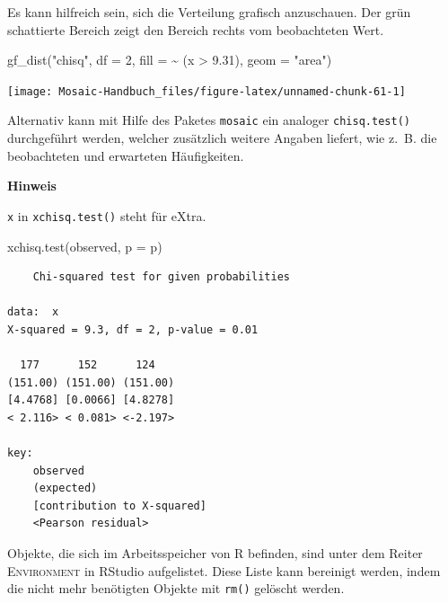 \documentclass[
  ngerman,
]{scrbook}
\newenvironment{Shaded}{\begin{snugshade}}{\end{snugshade}}
\newcommand{\AttributeTok}[1]{\textcolor[rgb]{0.77,0.63,0.00}{#1}}
\newcommand{\DecValTok}[1]{\textcolor[rgb]{0.00,0.00,0.81}{#1}}
\newcommand{\FloatTok}[1]{\textcolor[rgb]{0.00,0.00,0.81}{#1}}
\newcommand{\FunctionTok}[1]{\textcolor[rgb]{0.00,0.00,0.00}{#1}}
\newcommand{\NormalTok}[1]{#1}
\newcommand{\SpecialCharTok}[1]{\textcolor[rgb]{0.00,0.00,0.00}{#1}}
\newcommand{\StringTok}[1]{\textcolor[rgb]{0.31,0.60,0.02}{#1}}
\newenvironment{hinweis}[1]
  {
  \begin{itemize}
  \renewcommand{\labelitemi}{
    \raisebox{1.8\height}[0pt][0pt]{
      {\setkeys{Gin}{width=7em,keepaspectratio}
        {\Large \textcolor{dark-fom-green}\faHandORight}}
        }
  }
  \begin{blackbox}
        \bgroup\color{dark-fom-green}
          {\textbf{Hinweis}}
        \egroup
  \item
  }
  {
  \end{blackbox}
  \end{itemize}
  }
\newenvironment{note}[1]
  {
  \begin{itemize}
  \renewcommand{\labelitemi}{
    \raisebox{-.01\height}[0pt][0pt]{
      {\setkeys{Gin}{width=7em,keepaspectratio}
        {\normalsize \textcolor{dark-fom-green}\faHashtag}}
        }
  }
  \begin{blackbox}
   \item
    }
    {
  \end{blackbox}
  \end{itemize}
  }
\begin{document}
Es kann hilfreich sein, sich die Verteilung grafisch anzuschauen. Der grün schattierte Bereich zeigt den Bereich rechts vom beobachteten Wert.

\begin{Shaded}
\begin{Highlighting}[]
\FunctionTok{gf\_dist}\NormalTok{(}\StringTok{"chisq"}\NormalTok{, }\AttributeTok{df =} \DecValTok{2}\NormalTok{, }\AttributeTok{fill =} \SpecialCharTok{\textasciitilde{}}\NormalTok{ (x }\SpecialCharTok{\textgreater{}} \FloatTok{9.31}\NormalTok{), }
        \AttributeTok{geom =} \StringTok{"area"}\NormalTok{)}
\end{Highlighting}
\end{Shaded}

\begin{center}\texttt{[image: Mosaic-Handbuch\_files/figure-latex/unnamed-chunk-61-1]} \end{center}

Alternativ kann mit Hilfe des Paketes \texttt{mosaic} ein analoger \texttt{chisq.test()} durchgeführt werden, welcher zusätzlich weitere Angaben liefert, wie z.~B. die beobachteten und erwarteten Häufigkeiten.

\begin{hinweis}{hinweis}
\texttt{x} in \texttt{xchisq.test()} steht für eXtra.

\end{hinweis}

\begin{Shaded}
\begin{Highlighting}[]
\FunctionTok{xchisq.test}\NormalTok{(observed, }\AttributeTok{p =}\NormalTok{ p)}
\end{Highlighting}
\end{Shaded}

\begin{verbatim}
    Chi-squared test for given probabilities

data:  x
X-squared = 9.3, df = 2, p-value = 0.01

  177      152      124   
(151.00) (151.00) (151.00)
[4.4768] [0.0066] [4.8278]
< 2.116> < 0.081> <-2.197>
     
key:
    observed
    (expected)
    [contribution to X-squared]
    <Pearson residual>
\end{verbatim}

\begin{note}{note}
Objekte, die sich im Arbeitsspeicher von \textsf{R} befinden, sind unter dem Reiter \textsc{Environment} in \textsf{RStudio} aufgelistet. Diese Liste kann bereinigt werden, indem die nicht mehr benötigten Objekte mit \texttt{rm()} gelöscht werden.

\end{note}
\end{document}
